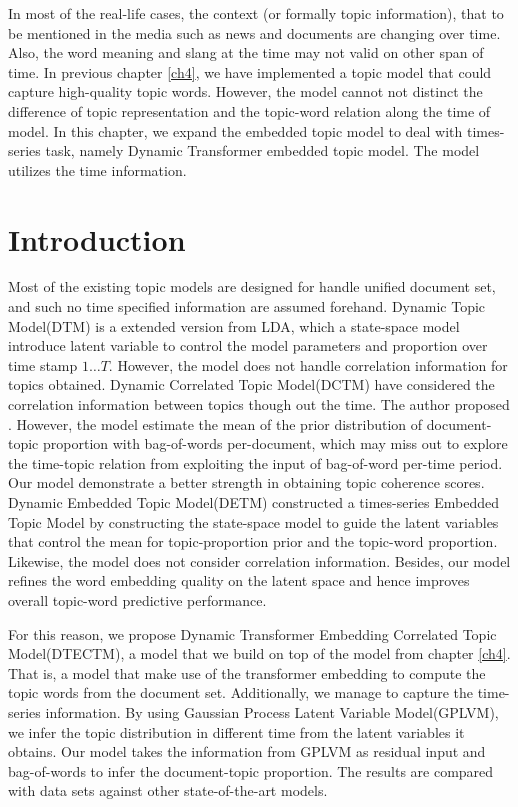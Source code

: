 In most of the real-life cases, the context (or formally topic information), that to be mentioned in the media such as news and documents are changing over time. Also, the word meaning and slang at the time may not valid on other span of time.
In previous chapter \ref{ch4}, we have implemented a topic model that could capture high-quality topic words. However, the model cannot not distinct the difference of topic representation and the topic-word relation along the time of model.
In this chapter, we expand the embedded topic model to deal with times-series task, namely Dynamic Transformer embedded topic model. The model utilizes the time information.
\section{Introduction}
Most of the existing topic models are designed for handle unified document set, and such no time specified information are assumed forehand. 
Dynamic Topic Model(DTM)\cite{blei_dynamic_2006} is a extended version from LDA, which a state-space model introduce latent variable to control the model parameters and proportion over time stamp $ 1\dots T $. However, the model does not handle correlation information for topics obtained.
Dynamic Correlated Topic Model(DCTM)\cite{tomasi_stochastic_2020} have considered the correlation information between topics though out the time. The author proposed . However, the model estimate the mean of the prior distribution of document-topic proportion with bag-of-words per-document, which may miss out to explore the time-topic relation from exploiting the input of bag-of-word per-time period. Our model demonstrate a better strength in obtaining topic coherence scores.
Dynamic Embedded Topic Model(DETM)\cite{dieng_dynamic_2019} constructed a times-series Embedded Topic Model by constructing the state-space model to guide the latent variables that control the mean for topic-proportion prior and the topic-word proportion. Likewise, the model does not consider correlation information. Besides, our model refines the word embedding quality on the latent space and hence improves overall topic-word predictive performance.

For this reason, we propose Dynamic Transformer Embedding Correlated Topic Model(DTECTM), a model that we build on top of the model from chapter \ref{ch4}. That is, a model that make use of the transformer embedding to compute the topic words from the document set. Additionally, we manage to capture the time-series information. By using Gaussian Process Latent Variable Model(GPLVM), we infer the topic distribution in different time from the latent variables it obtains. Our model takes the information from GPLVM as residual input and bag-of-words to infer the document-topic proportion. The results are compared with data sets against other state-of-the-art models.

